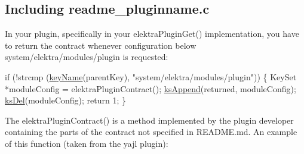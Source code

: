 \subsection*{Including {\ttfamily readme\+\_\+pluginname.\+c}}

In your plugin, specifically in your {\ttfamily elektra\+Plugin\+Get()} implementation, you have to return the contract whenever configuration below {\ttfamily system/elektra/modules/plugin} is requested\+:


\begin{DoxyCode}
\textcolor{keywordflow}{if} (!strcmp (\hyperlink{group__keyname_ga8e805c726a60da921d3736cda7813513}{keyName}(parentKey), \textcolor{stringliteral}{"system/elektra/modules/plugin"}))
\{
        KeySet *moduleConfig = elektraPluginContract();
        \hyperlink{group__keyset_ga21eb9c3a14a604ee3a8bdc779232e7b7}{ksAppend}(returned, moduleConfig);
        \hyperlink{group__keyset_ga27e5c16473b02a422238c8d970db7ac8}{ksDel}(moduleConfig);
        \textcolor{keywordflow}{return} 1;
\}
\end{DoxyCode}


The {\ttfamily elektra\+Plugin\+Contract()} is a method implemented by the plugin developer containing the parts of the contract not specified in {\ttfamily R\+E\+A\+D\+M\+E.\+md}. An example of this function (taken from the {\ttfamily yajl} plugin)\+:


